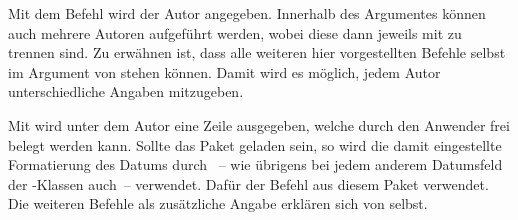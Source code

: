 \documentclass[%
  english,ngerman,%
  headings=optiontoheadandtoc,captions=tableheading,numbers=noenddot,%
  chapterpage,cdfoot,%
]{tudscrman}
\begin{document}
\begin{Declaration}{}
\begin{Declaration}{}
\begin{Declaration}{}
\begin{Declaration}{}
\begin{Declaration}{}
\begin{Declaration}{}
\printdeclarationlist%
%
%
%
Mit dem Befehl  wird der Autor angegeben. Innerhalb des 
Argumentes können auch mehrere Autoren aufgeführt werden, wobei diese dann 
jeweils mit  zu trennen sind. Zu erwähnen ist, dass alle weiteren 
hier vorgestellten Befehle selbst im Argument von  stehen 
können. Damit wird es möglich, jedem Autor unterschiedliche Angaben mitzugeben.

Mit  wird unter dem Autor eine Zeile ausgegeben, welche 
durch den Anwender frei belegt werden kann. Sollte das Paket  
geladen sein, so wird die damit eingestellte Formatierung des Datums durch 
~-- wie übrigens bei jedem anderem Datumsfeld der 
\TUDScript-Klassen auch~--  verwendet. Dafür der Befehl  aus 
diesem Paket verwendet. Die weiteren Befehle als zusätzliche Angabe erklären 
sich von selbst.
\end{Declaration}
\end{Declaration}
\end{Declaration}
\end{Declaration}
\end{Declaration}
\end{Declaration}
\end{document}

